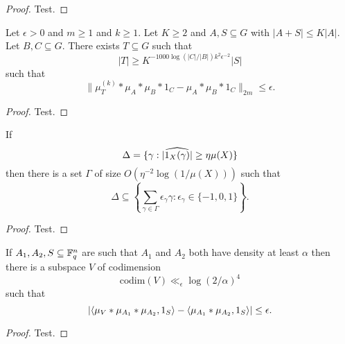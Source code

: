 \begin{proof}
Test.
\end{proof}


\begin{theorem}
\label{linfty_ap_boosted}
Let $\epsilon>0$ and $m\geq 1$ and $k\geq 1$. Let $K\geq 2$ and $A,S\subseteq G$ with $\lvert A+S\rvert\leq K\lvert A\rvert$. Let $B,C\subseteq G$. There exists $T\subseteq G$ such that
\[\lvert T\rvert \geq K^{-1000\log(\lvert C\rvert/\lvert B\rvert)k^2\epsilon^{-2}}\lvert S\rvert\]
such that
\[\| \mu_T^{(k)}\ast\mu_A\ast \mu_B\ast 1_C-\mu_A\ast \mu_B\ast 1_C\|_{2m}\leq \epsilon.\]
\end{theorem}

\begin{proof}
Test.
\end{proof}

\begin{theorem}
\label{chang}
If
\[\Delta = \{ \gamma : \lvert \widehat{1_{X}(\gamma)}\rvert \geq \eta \mu(X)\}\]
then there is a set $\Gamma$ of size $O(\eta^{-2}\log(1/\mu(X)))$ such that
\[\Delta\subseteq \left\{\sum_{\gamma\in\Gamma}\epsilon_\gamma\gamma : \epsilon_\gamma\in \{-1,0,1\}\right\}.\]
\end{theorem}
\begin{proof}
Test.
\end{proof}

\begin{theorem}\label{ap_in_ff}
If $A_1,A_2,S\subseteq \mathbb{F}_q^n$ are such that $A_1$ and $A_2$ both have density at least $\alpha$ then there is a subspace $V$ of codimension
\[\mathrm{codim}(V)\ll_\epsilon \log(2/\alpha)^4\]
such that
\[\left\lvert \langle \mu_V\ast \mu_{A_1}\ast \mu_{A_2},1_{S}\rangle-\langle \mu_{A_1}\ast \mu_{A_2},1_{S}\rangle\right\rvert\leq \epsilon.\]
\end{theorem}
\begin{proof}
Test.
\end{proof}
